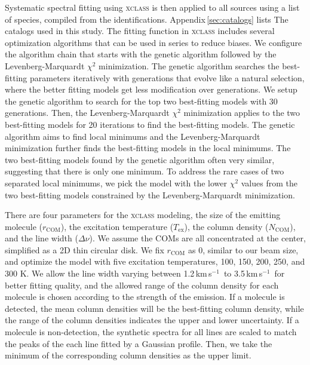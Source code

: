 \documentclass[twocolumn]{aastex62}
\newcommand{\kms}{\mbox{\,km\,s$^{-1}$}}
\begin{document}
Systematic spectral fitting using \textsc{xclass} is then applied to all sources using a list of species, compiled from the identifications.  Appendix\,\ref{sec:catalogs} lists The catalogs used in this study.  The fitting function in \textsc{xclass} includes several optimization algorithms that can be used in series to reduce biases.  We configure the algorithm chain that starts with the genetic algorithm followed by the Levenberg-Marquardt $\chi^{2}$ minimization.  The genetic algorithm searches the best-fitting parameters iteratively with generations that evolve like a natural selection, where the better fitting models get less modification over generations.  We setup the genetic algorithm to search for the top two best-fitting models with 30 generations.  Then, the Levenberg-Marquardt $\chi^{2}$ minimization applies to the two best-fitting models for 20 iterations to find the best-fitting models.  The genetic algorithm aims to find local minimums and the Levenberg-Marquardt minimization further finds the best-fitting models in the local minimums.  The two best-fitting models found by the genetic algorithm often very similar, suggesting that there is only one minimum.  To address the rare cases of two separated local minimums, we pick the model with the lower $\chi^{2}$ values from the two best-fitting models constrained by the Levenberg-Marquardt minimization.  

There are four parameters for the \textsc{xclass} modeling, the size of the emitting molecule ($r_\text{COM}$), the excitation temperature ($T_\text{ex}$), the column density ($N_\text{COM}$), and the line width ($\Delta \nu$).  We assume the COMs are all concentrated at the center, simplified as a 2D thin circular disk.  We fix $r_\text{COM}$ as 0, similar to our beam size, and optimize the model with five excitation temperatures, 100, 150, 200, 250, and 300 K.  We allow the line width varying between 1.2\kms\ to 3.5\kms\ for better fitting quality, and the allowed range of the column density for each molecule is chosen according to the strength of the emission.  If a molecule is detected, the mean column densities will be the best-fitting column density, while the range of the column densities indicates the upper and lower uncertainty.  If a molecule is non-detection, the synthetic spectra for all lines are scaled to match the peaks of the each line fitted by a Gaussian profile.  Then, we take the minimum of the corresponding column densities as the upper limit.

\newpage

\end{document}
